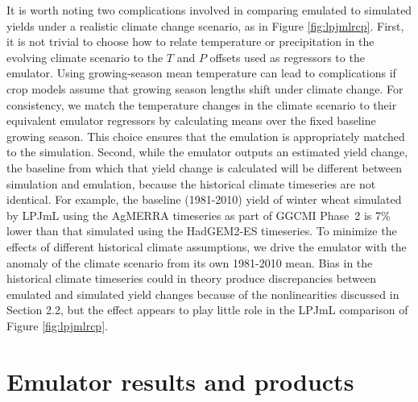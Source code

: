 \documentclass[gmdd]{copernicus} %
\begin{document}
It is worth noting two complications involved in comparing emulated to simulated yields under a realistic climate change scenario, as in Figure \ref{fig:lpjmlrcp}.
First, it is not trivial to choose how to relate temperature or precipitation in the evolving climate scenario to the $T$ and $P$ offsets used as regressors to the emulator. 
Using growing-season mean temperature can lead to complications if crop models assume that growing season lengths shift under climate change. 
For consistency, we match the temperature changes in the climate scenario to their equivalent emulator regressors by calculating means over the fixed baseline growing season. 
This choice ensures that the emulation is appropriately matched to the simulation.
Second, while the emulator outputs an estimated yield change, the baseline from which that yield change is calculated will be different between simulation and emulation, because the historical climate timeseries are not identical. For example, the baseline (1981-2010) yield of winter wheat simulated by LPJmL using the AgMERRA timeseries as part of GGCMI Phase~2 is 7\% lower than that simulated using the HadGEM2-ES timeseries. 
To minimize the effects of different historical climate assumptions, we drive the emulator with the anomaly of the climate scenario from its own 1981-2010 mean. 
Bias in the historical climate timeseries could in theory produce discrepancies between emulated and simulated yield changes because of the nonlinearities discussed in Section 2.2, but the effect appears to play little role in the LPJmL comparison of Figure \ref{fig:lpjmlrcp}. 

\section{Emulator results and products}
\label{S:5}
\end{document}
